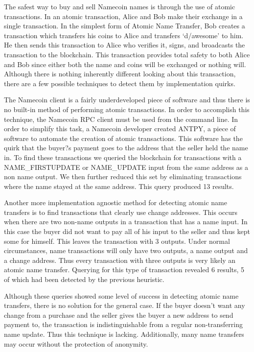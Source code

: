 The safest way to buy and sell Namecoin names is through the use of atomic transactions. In an atomic transaction, Alice and Bob make their exchange in a single transaction. In the simplest form of Atomic Name Transfer, Bob creates a transaction which transfers his coins to Alice and transfers `d/awesome' to him. He then sends this transaction to Alice who verifies it, signs, and broadcasts the transaction to the blockchain. This transaction provides total safety to both Alice and Bob since either both the name and coins will be exchanged or nothing will. Although there is nothing inherently different looking about this transaction, there are a few possible techniques to detect them by implementation quirks.

The Namecoin client is a fairly underdeveloped piece of software and thus there is no built-in method of performing atomic transactions. In order to accomplish this technique, the Namecoin RPC client must be used from the command line. In order to simplify this task, a Namecoin developer created ANTPY, a piece of software to automate the creation of atomic transactions. This software has the quirk that the buyer?s payment goes to the address that the seller held the name in. To find these transactions we queried the blockchain for transactions with a NAME\_FIRSTUPDATE or NAME\_UPDATE input from the same address as a non name output. We then further reduced this set by eliminating transactions where the name stayed at the same address. This query produced 13 results.

Another more implementation agnostic method for detecting atomic name transfers is to find transactions that clearly use change addresses. This occurs when there are two non-name outputs in a transaction that has a name input. In this case the buyer did not want to pay all of his input to the seller and thus kept some for himself. This leaves the transaction with 3 outputs. Under normal circumstances, name transactions will only have two outputs, a name output and a change address. Thus every transaction with three outputs is very likely an atomic name transfer. Querying for this type of transaction revealed 6 results, 5 of which had been detected by the previous heuristic.

Although these queries showed some level of success in detecting atomic name transfers, there is no solution for the general case. If the buyer doesn't want any change from a purchase and the seller gives the buyer a new address to send payment to, the transaction is indistinguishable from a regular non-transferring name update. Thus this technique is lacking. Additionally, many name transfers may occur without the protection of anonymity.

